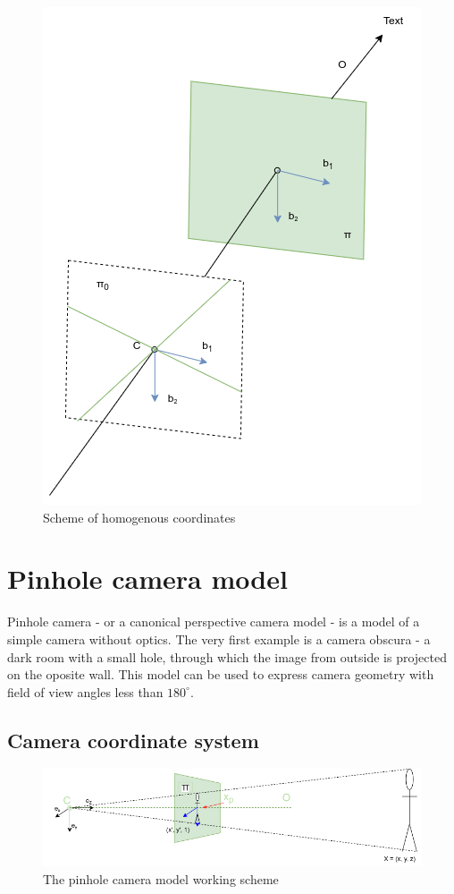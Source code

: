 \begin{figure}[h]
    \centering
    \includegraphics[width=.5\textwidth]{graphics/homogenous.png}
    \caption{Scheme of homogenous coordinates}
    \label{fig:homogenous}
\end{figure}

\section{Pinhole camera model}
Pinhole camera - or a canonical perspective camera model - is a model of a simple camera without optics.
The very first example is a camera obscura - a dark room with a small hole, through which the image from outside is projected on the oposite wall. 
This model can be used to express camera geometry with field of view angles less than $180^{\circ}$.

\subsection{Camera coordinate system}
\begin{figure}[h]
    \centering
    \includegraphics[width=1\textwidth]{graphics/td_scene.png}
    \caption{The pinhole camera model working scheme}
    \label{fig:td_scene_3d}
\end{figure}

